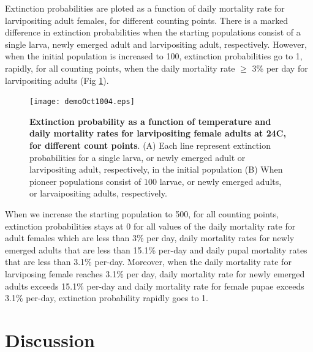 \newpage

Extinction probabilities are ploted as a function of daily mortality rate for larvipositing adult females, for different counting points. There is a marked difference in extinction probabilities when the starting populations consist of a single larva, newly emerged adult and larvipositing adult, respectively. However, when the initial population is increased to 100, extinction probabilities go to 1, rapidly, for all counting points, when the daily mortality rate $\geq$ 3\% per day for larvipositing adults (Fig \ref{fig:5}). 



 \begin{figure}[h]
 	\texttt{[image: demoOct1004.eps]}
 	\caption{{\bf Extinction probability as a function of temperature and daily mortality rates for larvipositing female adults at 24\degree C, for different count points}. (A) Each line represent extinction probabilities for a single larva, or  newly emerged adult or larvipositing adult, respectively, in the initial population (B) When pioneer populations consist of  $100$ larvae,  or  newly emerged adults, or larvaipositing adults, respectively.}
 	\label{fig:5}       %
 \end{figure}
 
When we increase the starting population to 500, for all counting points, extinction probabilities stays at 0 for all values of the daily mortality rate for adult females which are less than 3\% per day, daily mortality rates for newly emerged adults that are less than 15.1\% per-day and daily pupal mortality rates that are less than 3.1\% per-day. Moreover, when the daily mortality rate for larviposing female reaches 3.1\% per day, daily mortality rate for newly emerged adults exceeds 15.1\% per-day and daily mortality rate for female pupae exceeds 3.1\% per-day, extinction probability rapidly goes to 1. 
\newpage

\section{Discussion}

